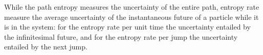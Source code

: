 \documentclass[smallextended]{svjour3}
\makeatletter
\renewcommand*{\eqref}[1]{%
  \hyperref[{#1}]{\textup{\tagform@{\ref*{#1}}}}%
}
\newcommand{\E}{\mathbb{E}}
\newcommand{\TT}{\mathcal{T}}
\renewcommand{\H}{\mathbb{H}}
\newcommand{\suml}{\sum\limits}
\newcommand{\vnorms}[1]{\|#1\|}
\makeatother
\begin{document}
While the path entropy measures the uncertainty of the entire path, entropy rate measure the average uncertainty of the instantaneous future of a particle while it is in the system: for the entropy rate per unit time the uncertainty entailed by the infinitesimal future, and for the entropy rate per jump the uncertainty entailed by the next jump.
% 
\end{document}
